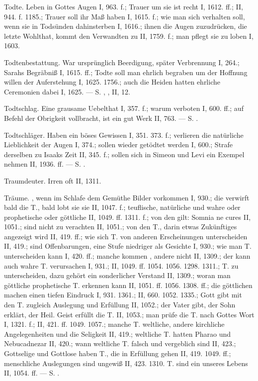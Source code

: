 Todte. Leben in Gottes Augen I, 963. f.; Trauer um sie ist recht I, 1612. ff.; II, 944. f. 1185.; Trauer soll ihr Maß haben I, 1615. f.; wie man sich verhalten soll, wenn sie in Todsünden dahinsterben I, 1616.; ihnen die Augen zuzudrücken, die letzte Wohlthat, kommt den Verwandten zu II, 1759. f.; man pflegt sie zu loben I, 1603.

Todtenbestattung. War ursprünglich Beerdigung, später
Verbrennung I, 264.; Sarahs Begräbniß I, 1615. ff.; Todte soll man ehrlich begraben um der Hoffnung willen der Auferstehung I, 1625. 1756.; auch die Heiden hatten ehrliche Ceremonien dabei I, 1625. — S. , ,  II, 12.

Todtschlag. Eine grausame Uebelthat I, 357. f.; warum verboten I, 600. ff.; auf Befehl der Obrigkeit vollbracht, ist ein gut Werk II, 763. — S. .

Todtschläger. Haben ein böses Gewissen I, 351. 373. f.; verlieren die natürliche Lieblichkeit der Augen I, 374.; sollen wieder getödtet werden I, 600.; Strafe derselben zu Isaaks Zeit II, 345. f.; sollen sich in Simeon und Levi ein Exempel nehmen II, 1936. ff. — S. .

Traumdeuter. Irren oft II, 1311.

Träume. , wenn im Schlafe dem Gemüthe Bilder vorkommen I, 930.; die  verwirft bald die T., bald lobt sie sie II, 1047. f.;  teuflische, natürliche und wahre oder prophetische oder göttliche II, 1049. ff. 1311. f.; von den  gilt: Somnia ne cures II, 1051.;  sind nicht zu verachten II, 1051.; von den T., darin etwas Zukünftiges angezeigt wird II, 419. ff.; wie sich T. von anderen Erscheinungen unterscheiden II, 419.; sind Offenbarungen, eine Stufe niedriger als Gesichte I, 930.; wie man  T. unterscheiden kann I, 420. ff.; manche kommen , andere nicht II, 1309.; der  kann auch wahre T. verursachen I, 931.; II, 1049. ff. 1054. 1056. 1298. 1311.; T. zu unterscheiden, dazu gehört ein sonderlicher Verstand II, 1309.; woran man göttliche prophetische T. erkennen kann II, 1051. ff. 1056. 1308. ff.; die göttlichen machen einen tiefen Eindruck I, 931. 1361.; II, 660. 1052. 1335.; Gott gibt mit den T. zugleich Auslegung und Erfüllung II, 1052.; der Vater gibt, der Sohn erklärt, der Heil. Geist erfüllt die T. II, 1053.; man prüfe die T. nach Gottes Wort I, 1321. f.; II, 421. ff. 1049. 1057.; manche T.  weltliche, andere kirchliche Angelegenheiten und die Seligkeit II, 419.; weltliche T. hatten Pharao und Nebucadnezar II, 420.; wann weltliche T. falsch und vergeblich sind II, 423.; Gottselige und Gottlose haben T., die in Erfüllung gehen II, 419. 1049. ff.; menschliche Auslegungen sind ungewiß II, 423. 1310. T. sind ein  unseres Lebens II, 1054. ff. — S. .


